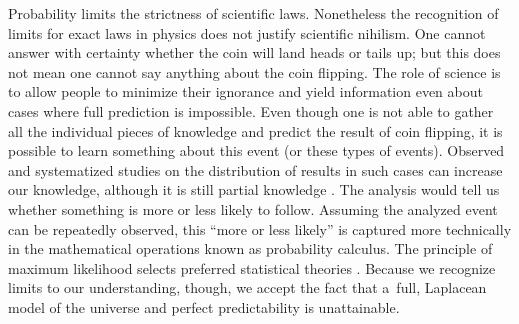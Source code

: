 Probability limits the strictness of scientific laws. Nonetheless the recognition of limits for exact laws in physics does not justify scientific nihilism. One cannot answer with certainty whether the coin will land heads or tails up; but this does not mean one cannot say anything about the coin flipping. The role of science is to allow people to minimize their ignorance and yield information even about cases where full prediction is impossible. Even though one is not able to gather all the individual pieces of knowledge and predict the result of coin flipping, it is possible to learn something about this event (or these types of events). Observed and systematized studies on the distribution of results in such cases can increase our knowledge, although it is still partial knowledge 
\parencite[][p.254]{kyburg_probability_1966}. %
 The analysis would tell us whether something is more or less likely to follow. Assuming the analyzed event can be repeatedly observed, this ``more or less likely'' is captured more technically in the mathematical operations known as probability calculus. The principle of maximum likelihood selects preferred statistical theories 
\parencite[][p.328]{swinburne_probability_1971}. %
 Because we recognize limits to our understanding, though, we accept the fact that a~full, Laplacean model of the universe and perfect predictability is unattainable.



